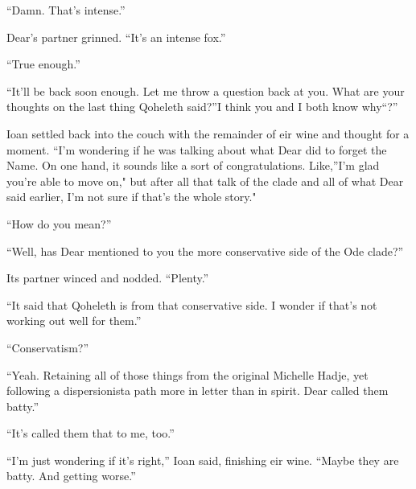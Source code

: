 ``Damn. That's intense.''

Dear's partner grinned. ``It's an intense fox.''

``True enough.''

``It'll be back soon enough. Let me throw a question back at you. What are your thoughts on the last thing Qoheleth said?''I think you and I both know why``?''

Ioan settled back into the couch with the remainder of eir wine and thought for a moment. ``I'm wondering if he was talking about what Dear did to forget the Name. On one hand, it sounds like a sort of congratulations. Like,''I'm glad you're able to move on," but after all that talk of the clade and all of what Dear said earlier, I'm not sure if that's the whole story."

``How do you mean?''

``Well, has Dear mentioned to you the more conservative side of the Ode clade?''

Its partner winced and nodded. ``Plenty.''

``It said that Qoheleth is from that conservative side. I wonder if that's not working out well for them.''

``Conservatism?''

``Yeah. Retaining all of those things from the original Michelle Hadje, yet following a dispersionista path more in letter than in spirit. Dear called them batty.''

``It's called them that to me, too.''

``I'm just wondering if it's right,'' Ioan said, finishing eir wine. ``Maybe they are batty. And getting worse.''
